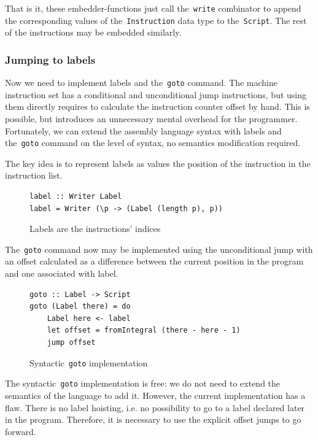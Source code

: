 That is it, these embedder-functions just call the~\texttt{write}
combinator to append the corresponding values of the~\texttt{Instruction}
data type to the~\texttt{Script}. The rest of the instructions may
be embedded similarly.

\subsubsection{Jumping to labels}

Now we need to implement labels and the~\texttt{goto} command. The machine
instruction set has a conditional and unconditional jump instructions, but using them
directly requires to calculate the instruction counter offset by hand. This is possible,
but introduces an unnecessary mental overhead for the programmer. Fortunately, we
can extend the assembly language syntax with labels and the~\texttt{goto}
command on the level of syntax, no semantics modification required.

The key idea is to represent labels as values the position of the instruction in the
instruction list.

\begin{figure}[H]
\begin{verbatim}
label :: Writer Label
label = Writer (\p -> (Label (length p), p))
\end{verbatim}
\caption{Labels are the instructions' indices}
\label{label}
\end{figure}

The~\texttt{goto} command now may be implemented using the unconditional
jump with an offset calculated as a difference between the current position in the program and
one associated with label.

\begin{figure}[H]
\begin{verbatim}
goto :: Label -> Script
goto (Label there) = do
    Label here <- label
    let offset = fromIntegral (there - here - 1)
    jump offset
\end{verbatim}
\caption{Syntactic~\texttt{goto} implementation}
\label{goto}
\end{figure}

The syntactic~\texttt{goto} implementation is free: we do not need
to extend the semantics of the language to add it. However, the current implementation
has a flaw. There is no label hoisting, i.e. no possibility to go to a label declared later
in the program. Therefore, it is necessary to use the explicit offset jumps to
go forward.

